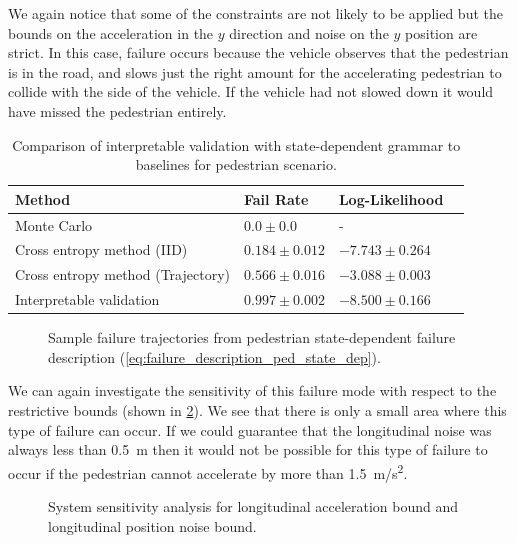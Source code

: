 We again notice that some of the constraints are not likely to be applied but the bounds on the acceleration in the $y$ direction and noise on the $y$ position are strict. In this case, failure occurs because the vehicle observes that the pedestrian is in the road, and slows just the right amount for the accelerating pedestrian to collide with the side of the vehicle. If the vehicle had not slowed down it would have missed the pedestrian entirely.
\begin{table}
    \centering
    \caption{Comparison of interpretable validation with state-dependent grammar to baselines for pedestrian scenario.}
    \label{tab:ped_results_state_dependent}
    \begin{tabular}{@{}llll@{}} 
        \toprule
        \textbf{Method} & \textbf{Fail Rate} & \textbf{Log-Likelihood} \\
        \midrule
        Monte Carlo & $0.0 \pm 0.0$ &  -   \\
        Cross entropy method (IID) & $0.184 \pm 0.012$ & $-7.743 \pm 0.264$\\
        Cross entropy method (Trajectory) & $0.566 \pm 0.016$ & $-3.088 \pm 0.003$ \\
        Interpretable validation & $0.997 \pm 0.002$ & $-8.500 \pm 0.166$ \\
        \bottomrule
    \end{tabular}
\end{table}

\begin{figure}
    
    \caption{Sample failure trajectories from pedestrian state-dependent failure description (\cref{eq:failure_description_ped_state_dep}).}
    \label{fig:ped_state_dep_sample_failures}
\end{figure}

We can again investigate the sensitivity of this failure mode with respect to the restrictive bounds (shown in \cref{fig:ped_state_sensititivty}). We see that there is only a small area where this type of failure can occur. If we could guarantee that the longitudinal noise was always less than \SI{0.5}{m} then it would not be possible for this type of failure to occur if the pedestrian cannot accelerate by more than \SI{1.5}{m/s^2}. 

\begin{figure}
    \centering
    
    \caption{System sensitivity analysis for longitudinal acceleration bound and longitudinal position noise bound.}
    \label{fig:ped_state_sensititivty}
\end{figure}

